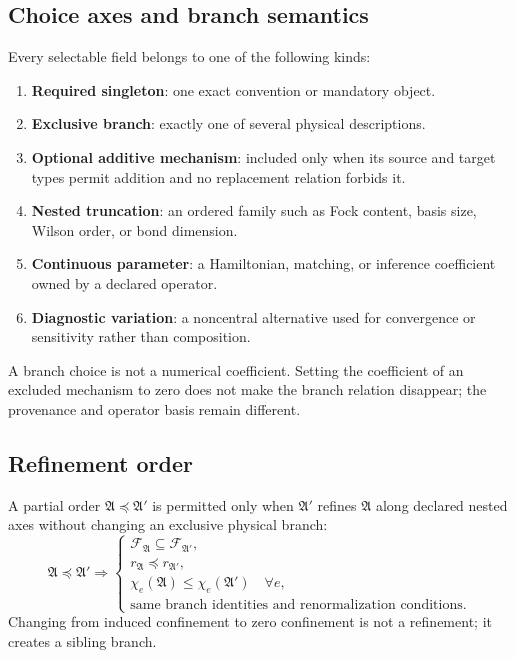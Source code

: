\documentclass[11pt]{article}
\newcommand{\cF}{\mathcal F}
\newcommand{\Aset}{\mathfrak A}
\begin{document}
\subsection{Choice axes and branch semantics}

Every selectable field belongs to one of the following kinds:
\begin{enumerate}
 \item \textbf{Required singleton}: one exact convention or mandatory object.
 \item \textbf{Exclusive branch}: exactly one of several physical descriptions.
 \item \textbf{Optional additive mechanism}: included only when its source and
 target types permit addition and no replacement relation forbids it.
 \item \textbf{Nested truncation}: an ordered family such as Fock content,
 basis size, Wilson order, or bond dimension.
 \item \textbf{Continuous parameter}: a Hamiltonian, matching, or inference
 coefficient owned by a declared operator.
 \item \textbf{Diagnostic variation}: a noncentral alternative used for
 convergence or sensitivity rather than composition.
\end{enumerate}
A branch choice is not a numerical coefficient.  Setting the coefficient of
an excluded mechanism to zero does not make the branch relation disappear;
the provenance and operator basis remain different.

\subsection{Refinement order}

A partial order \(\Aset\preceq\Aset'\) is permitted only when
\(\Aset'\) refines \(\Aset\) along declared nested axes without changing an
exclusive physical branch:
\begin{equation}
 \Aset\preceq\Aset'
 \Longrightarrow
 \begin{cases}
 \cF_{\Aset}\subseteq\cF_{\Aset'},\\
 r_{\Aset}\preceq r_{\Aset'},\\
 \chi_e(\Aset)\leq\chi_e(\Aset')\quad\forall e,\\
 \text{same branch identities and renormalization conditions}.
 \end{cases}
\label{eq:assumption-refinement}
\end{equation}
Changing from induced confinement to zero confinement is not a refinement; it
creates a sibling branch.
\end{document}
